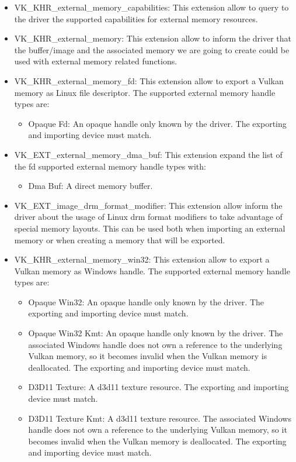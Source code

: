 \begin{itemize}
	\item VK\_KHR\_external\_memory\_capabilities: This extension allow to query to the driver the supported capabilities for external memory resources.
	\item VK\_KHR\_external\_memory: This extension allow to inform the driver that the buffer/image and the associated memory we are going to create could be used with external memory related functions.
	\item VK\_KHR\_external\_memory\_fd: This extension allow to export a Vulkan memory as Linux file descriptor. The supported external memory handle types are:
	\begin{itemize}
		\item Opaque Fd: An opaque handle only known by the driver. The exporting and importing device must match.
	\end{itemize}
	\item VK\_EXT\_external\_memory\_dma\_buf: This extension expand the list of the fd supported external memory handle types with:
	\begin{itemize}
		\item Dma Buf: A direct memory buffer.
	\end{itemize}
	\item VK\_EXT\_image\_drm\_format\_modifier: This extension allow inform the driver about the usage of Linux drm format modifiers to take advantage of special memory layouts. This can be used both when importing an external memory or when creating a memory that will be exported. 
	\item VK\_KHR\_external\_memory\_win32: This extension allow to export a Vulkan memory as Windows handle. The supported external memory handle types are:
	\begin{itemize}
		\item Opaque Win32: An opaque handle only known by the driver. The exporting and importing device must match.
		\item Opaque Win32 Kmt: An opaque handle only known by the driver. The associated Windows handle does not own a reference to the underlying Vulkan memory, so it becomes invalid when the Vulkan memory is deallocated. The exporting and importing device must match.
		\item D3D11 Texture: A d3d11 texture resource. The exporting and importing device must match.
		\item D3D11 Texture Kmt: A d3d11 texture resource. The associated Windows handle does not own a reference to the underlying Vulkan memory, so it becomes invalid when the Vulkan memory is deallocated. The exporting and importing device must match.

\end{itemize}
\end{itemize}
